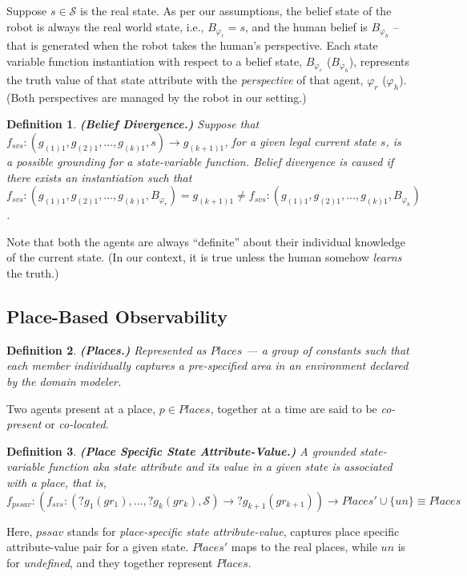\documentclass[letterpaper]{article} %
\newtheorem{definition}{Definition}
\begin{document}
Suppose $s \in \mathcal{S}$ is the real state. As per our assumptions, the belief state of the robot is always the real world state, i.e., $B_{\varphi_r} = s$, and the human belief is $B_{\varphi_h}$ -- that is generated when the robot takes the human's perspective. Each state variable function instantiation with respect to a belief state, $B_{\varphi_r}$ ($B_{\varphi_h}$), represents the truth value of that state attribute with the \textit{perspective} of that agent, $\varphi_r$ ($\varphi_h$). (Both perspectives are managed by the robot in our setting.) 

\begin{definition}
\textbf{(Belief Divergence.)}
Suppose that $f_{\textit{svs}}:(g_{(1)1},g_{(2)1},...,g_{(k)1},s)\rightarrow g_{(k+1)1}$, for a given legal current state $s$, is a possible {\em grounding} for a state-variable function. 
Belief divergence is caused if there exists an instantiation such that $f_{\textit{svs}}:(g_{(1)1},g_{(2)1},...,g_{(k)1},B_{\varphi_r}) = {g_{(k+1)1}}  \neq f_{\textit{svs}}:(g_{(1)1},g_{(2)1},...,g_{(k)1},B_{\varphi_h})$.
\end{definition} 
Note that both the agents are always ``definite'' about their individual knowledge of the current state. (In our context, it is true unless the human somehow \textit{learns} the truth.)

\subsection{Place-Based Observability}

\begin{definition}
\textbf{(Places.)} Represented as $\mathit{Places}$ --- a group of constants such that each member individually captures a pre-specified area in an environment declared by the domain modeler.  
\end{definition}
Two agents present at a place, $p \in \mathit{Places}$, together at a time are said to be \textit{co-present} or \textit{co-located}.

\begin{definition}
    \textbf{(Place Specific State Attribute-Value.)} A {\em grounded} state-variable function {\em aka} state attribute and its value in a given state is associated with a place, that is, $f_{pssav}: (f_{svs} :(?g_1(gr_1),...,?g_k(gr_k),\mathcal{S}) \rightarrow ?g_{k+1}(gr_{k+1})) \rightarrow \mathit{Places' \cup \{un\} \equiv Places}$
    \label{def:pssav}
\end{definition}
Here, $\mathit{pssav}$ stands for {\em place-specific state attribute-value}, captures place specific attribute-value pair for a given state. $\mathit{Places'}$ maps to the real places, while $\mathit{un}$ is for \textit{undefined}, and they together represent $\mathit{Places}$.
\end{document}
